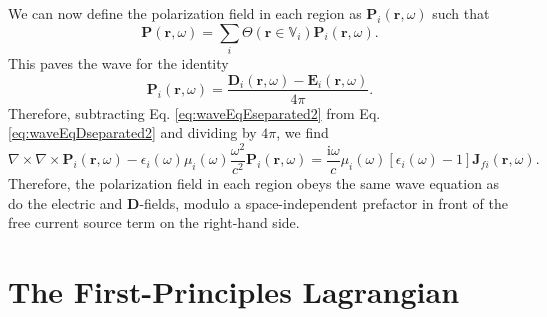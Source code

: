 \documentclass{article}
\begin{document}
We can now define the polarization field in each region as $\mathbf{P}_i(\mathbf{r},\omega)$ such that
\begin{equation}
\mathbf{P}(\mathbf{r},\omega) = \sum_i\Theta(\mathbf{r}\in\mathbb{V}_i)\mathbf{P}_i(\mathbf{r},\omega).
\end{equation}
This paves the wave for the identity
\begin{equation}
\mathbf{P}_i(\mathbf{r},\omega) = \frac{\mathbf{D}_i(\mathbf{r},\omega) - \mathbf{E}_i(\mathbf{r},\omega)}{4\pi}.
\end{equation}
Therefore, subtracting Eq. \eqref{eq:waveEqEseparated2} from Eq. \eqref{eq:waveEqDseparated2} and dividing by $4\pi$, we find
\begin{equation}
\nabla\times\nabla\times\mathbf{P}_i(\mathbf{r},\omega) - \epsilon_i(\omega)\mu_i(\omega)\frac{\omega^2}{c^2}\mathbf{P}_i(\mathbf{r},\omega) = \frac{\mathrm{i}\omega}{c}\mu_i(\omega)\left[\epsilon_i(\omega) - 1\right]\mathbf{J}_{fi}(\mathbf{r},\omega).
\end{equation}
Therefore, the polarization field in each region obeys the same wave equation as do the electric and $\mathbf{D}$-fields, modulo a space-independent prefactor in front of the free current source term on the right-hand side.








\section{The First-Principles Lagrangian}\label{sec:LagrangianExpansion}
\end{document}
